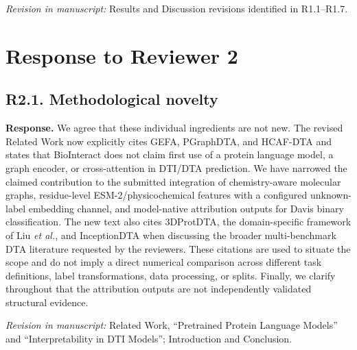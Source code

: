 \documentclass[11pt,a4paper]{article}
\newcommand{\response}{\noindent\textbf{Response.} }
\newcommand{\change}[1]{\par\smallskip\noindent\textit{Revision in manuscript:} #1\par\medskip}
\begin{document}
\change{Results and Discussion revisions identified in R1.1--R1.7.}

\section*{Response to Reviewer 2}

\subsection*{R2.1. Methodological novelty}


\response We agree that these individual ingredients are not new. The revised
Related Work now explicitly cites GEFA, PGraphDTA, and HCAF-DTA and states that
BioInteract does not claim first use of a protein language model, a graph
encoder, or cross-attention in DTI/DTA prediction. We have narrowed the claimed
contribution to the submitted integration of chemistry-aware molecular graphs,
residue-level ESM-2/physicochemical features with a configured unknown-label
embedding channel, and model-native attribution outputs for Davis binary
classification. The new text also cites 3DProtDTA, the domain-specific framework
of Liu \textit{et al.}, and InceptionDTA when discussing the broader
multi-benchmark DTA literature requested by the reviewers. These citations are
used to situate the scope and do not imply a direct numerical comparison across
different task definitions, label transformations, data processing, or splits.
Finally, we clarify throughout that the attribution outputs are not independently
validated structural evidence.

\change{Related Work, ``Pretrained Protein Language Models'' and
``Interpretability in DTI Models''; Introduction and Conclusion.}
\end{document}
